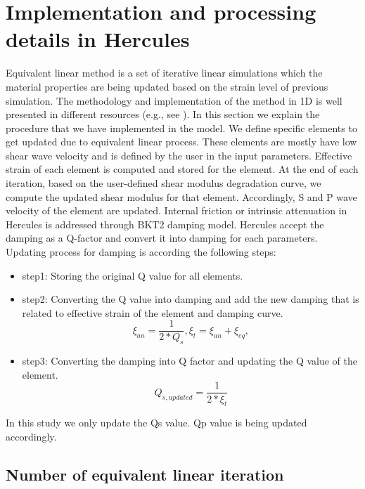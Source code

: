
\section{Implementation and processing details in Hercules}

Equivalent linear method is a set of iterative linear simulations which the material properties are being updated based on the strain level of previous simulation. The methodology and implementation of the method in 1D is well presented in different resources (e.g., see \citet{Kramer1996geotechnical}). In this section we explain the procedure that we have implemented in the model. We define specific elements to get updated due to equivalent linear process. These elements are mostly have low shear wave velocity and is defined by the user in the input parameters. Effective strain of each element is computed and stored for the element. At the end of each iteration, based on the user-defined shear modulus degradation curve, we compute the updated shear modulus for that element. Accordingly, S and P wave velocity of the element are updated. Internal friction or intrinsic attenuation in Hercules is addressed through BKT2 damping model. Hercules accept the damping as a Q-factor and convert it into damping for each parameters.  Updating process for damping is according the following steps:

\begin{itemize}
 \item step1: Storing the original Q value for all elements.
 \item step2: Converting the Q value into damping and add the new damping that is related to effective strain of the element and damping curve.
\begin{equation}
\xi_{an}=\frac{1}{2*Q_s}, 
\xi_{t}=\xi_{an} + \xi_{eq},
\end{equation}
\item step3: Converting the damping into Q factor and updating the Q value of the element. 
\begin{equation}
Q_{s,updated} = \frac{1}{2*\xi_{t}}
\end{equation}
\end{itemize}

In this study we only update the Qs value. Qp value is being updated accordingly.  


\subsection{Number of equivalent linear iteration}

